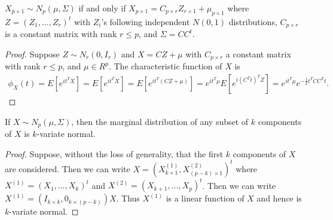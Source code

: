 \begin{theorem}
    $X_{p \times 1} \sim N_{p}(\mu,\Sigma)$ if and only if $X_{p \times 1} = C_{p \times r}Z_{r \times 1} + \mu_{p \times 1}$ where $Z = (Z_{1},\ldots,Z_{r})^{t}$ with $Z_{i}$'s following independent $N(0,1)$ distributions, $C_{p \times r}$ is a constant matrix with rank $r \leq p$, and $\Sigma = CC^{t}$.
\end{theorem}
\begin{proof}
    Suppose $Z \sim N_{r}(0, I_{r})$ and $X = CZ + \mu$ with $C_{p \times r}$ a constant matrix with rank $r \leq p$, and $\mu \in R^{p}$. The characteristic function of $X$ is
    \begin{align}
        \phi_{X}(t) = E[e^{it^{T}X}] = E[e^{it^{T}X}] = E[e^{it^{T}(CZ+\mu)}] = e^{it^{T}\mu}E[e^{i(C^{T}t)^{T}Z}] = e^{it^{T}\mu}e^{-\frac{1}{2}t^{T}CC^{T}t}.
    \end{align}
\end{proof}

\begin{theorem}
    If $X \sim N_{p}(\mu,\Sigma)$, then the marginal distribution of any subset of $k$ components of $X$ is $k$-variate normal.
\end{theorem}
\begin{proof}
    Suppose, without the loss of generality, that the first $k$ components of $X$ are considered. Then we can write $X = (X_{k \times 1}^{(1)}, X_{(p-k) \times 1}^{(2)})^{t}$ where $X^{(1)} = (X_{1},\ldots,X_{k})^{t}$ and $X^{(2)} = (X_{k+1},\ldots,X_{p})^{t}$. Then we can write $X^{(1)} = (I_{k \times k}, 0_{k \times (p-k)})X$. Thus $X^{(1)}$ is a linear function of $X$ and hence is $k$-variate normal.
\end{proof}

